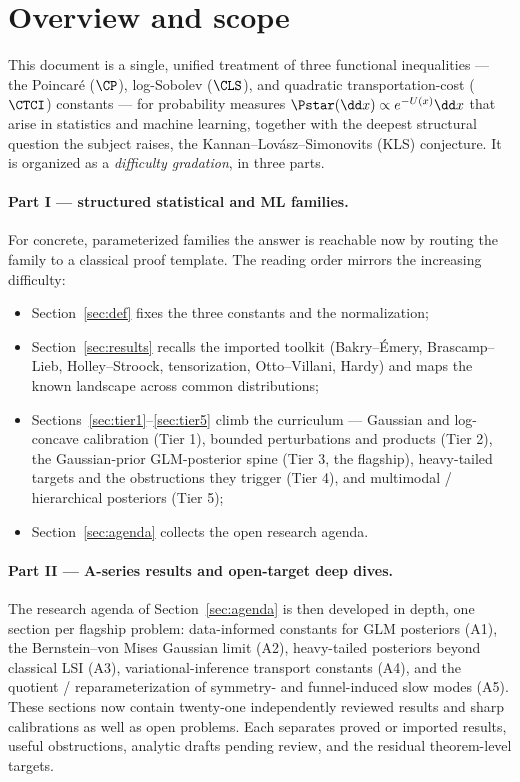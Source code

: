 \documentclass[../main.tex]{subfiles}
\begin{document}
\section{Overview and scope}
\label{sec:overview}

This document is a single, unified treatment of three functional inequalities --- the Poincar\'e
($\CP$), log-Sobolev ($\CLS$), and quadratic transportation-cost ($\CTCI$) constants --- for
probability measures $\Pstar(\dd x)\propto e^{-U(x)}\dd x$ that arise in statistics and machine
learning, together with the deepest structural question the subject raises, the
Kannan--Lov\'asz--Simonovits (KLS) conjecture. It is organized as a \emph{difficulty gradation}, in
three parts.

\paragraph{Part I --- structured statistical and ML families.}
For concrete, parameterized families the answer is reachable now by routing the family to a
classical proof template. The reading order mirrors the increasing difficulty:
\begin{itemize}[leftmargin=1.4em]
  \item Section~\ref{sec:def} fixes the three constants and the normalization;
  \item Section~\ref{sec:results} recalls the imported toolkit (Bakry--\'Emery,
        Brascamp--Lieb, Holley--Stroock, tensorization, Otto--Villani, Hardy) and maps the
        known landscape across common distributions;
  \item Sections~\ref{sec:tier1}--\ref{sec:tier5} climb the curriculum --- Gaussian and
        log-concave calibration (Tier 1), bounded perturbations and products (Tier 2), the
        Gaussian-prior GLM-posterior spine (Tier 3, the flagship), heavy-tailed targets and
        the obstructions they trigger (Tier 4), and multimodal / hierarchical posteriors
        (Tier 5);
  \item Section~\ref{sec:agenda} collects the open research agenda.
\end{itemize}

\paragraph{Part II --- A-series results and open-target deep dives.}
The research agenda of Section~\ref{sec:agenda} is then developed in depth, one section per
flagship problem: data-informed constants for GLM posteriors (A1), the Bernstein--von Mises
Gaussian limit (A2), heavy-tailed posteriors beyond classical LSI (A3), variational-inference
transport constants (A4), and the quotient / reparameterization of symmetry- and
funnel-induced slow modes (A5). These sections now contain twenty-one independently reviewed results and
sharp calibrations as well as open problems. Each separates proved or imported results, useful
obstructions, analytic drafts pending review, and the residual theorem-level targets.
\end{document}
